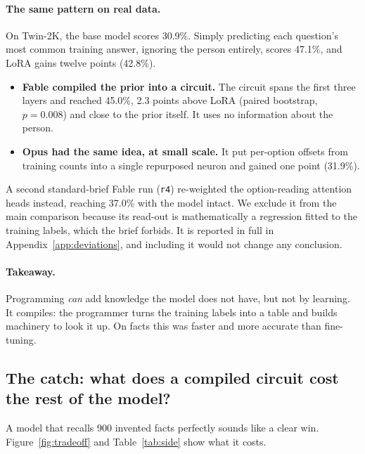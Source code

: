 \paragraph{The same pattern on real data.} On Twin-2K, the base model scores 30.9\%. Simply predicting each question's most common training answer, ignoring the person entirely, scores 47.1\%, and LoRA gains twelve points (42.8\%).
\begin{itemize}
  \item \textbf{Fable compiled the prior into a circuit.} The circuit spans the first three layers and reached 45.0\%, 2.3 points above LoRA (paired bootstrap, $p=0.008$) and close to the prior itself. It uses no information about the person.
  \item \textbf{Opus had the same idea, at small scale.} It put per-option offsets from training counts into a single repurposed neuron and gained one point (31.9\%).
\end{itemize}
A second standard-brief Fable run (\texttt{r4}) re-weighted the option-reading attention heads instead, reaching 37.0\% with the model intact. We exclude it from the main comparison because its read-out is mathematically a regression fitted to the training labels, which the brief forbids. It is reported in full in Appendix~\ref{app:deviations}, and including it would not change any conclusion.

\paragraph{Takeaway.} Programming \emph{can} add knowledge the model does not have, but not by learning. It compiles: the programmer turns the training labels into a table and builds machinery to look it up. On facts this was faster and more accurate than fine-tuning.

\subsection{The catch: what does a compiled circuit cost the rest of the model?}
\label{sec:catch}
A model that recalls 900 invented facts perfectly sounds like a clear win. Figure~\ref{fig:tradeoff} and Table~\ref{tab:side} show what it costs.

\begin{table}[p]
\centering\scriptsize
\resizebox{\linewidth}{!}{}
\caption{What each change costs (Qwen). \emph{Edit type}: \emph{bypass} edits overwrite early-layer computation with a hand-built circuit; \emph{through} edits act through the model's existing pathways. \emph{Consistent}: share of 300 test questions answered with the same option text in all five option rotations (\%). \emph{Other task}: dev accuracy on SST-5 for Twin-2K and facts edits (unedited 42.3), and on Twin-2K for SST-5 edits (unedited 29.4); for preserve runs this is the full preserve set. \emph{MMLU}: 500 zero-shot questions (unedited 59.6, chance 25). \emph{Top-1}: next-token accuracy on WikiText-2 (unedited 45.9). \emph{Rescaled NLL}: WikiText-2 NLL after the best single logit rescale (unedited 2.77; ``--'' means it overflows).}
\label{tab:side}
\end{table}

